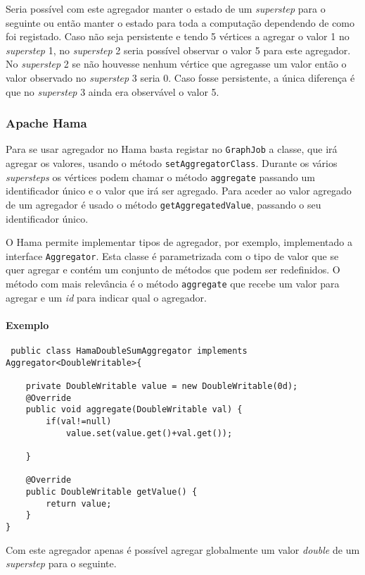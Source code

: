Seria possível com este agregador manter o estado de um \textit{superstep} para 
o seguinte ou então manter o estado para toda a computação dependendo de como 
foi registado. Caso não seja persistente e tendo 5 vértices a agregar o valor 1 
no \textit{superstep} 1, no \textit{superstep} 2 seria possível observar o 
valor 5 para este agregador. No \textit{superstep} 2 se não houvesse nenhum 
vértice que agregasse um valor então o valor observado no \textit{superstep} 3 
seria 0. Caso fosse persistente, a única diferença é que no \textit{superstep} 
3 ainda era observável o valor 5.

\subsubsection*{Apache Hama}
    Para se usar agregador no Hama basta registar no \texttt{GraphJob} a classe, que irá agregar os valores, usando o método
    \texttt{setAggregatorClass}. Durante os vários \textit{supersteps} os 
vértices podem chamar o método \texttt{aggregate} passando um identificador 
único
    e o valor que irá ser agregado. Para aceder ao valor agregado de um 
agregador é usado o método \texttt{getAggregatedValue}, passando o seu 
    identificador único.
    
    O Hama permite implementar tipos de agregador, por exemplo, implementado 
a interface \texttt{Aggregator}.
    Esta classe é parametrizada com o tipo de valor que se quer agregar e 
contém um conjunto de métodos que podem ser redefinidos.
O método com mais relevância é o método \texttt{aggregate} que recebe um 
valor para agregar e um \textit{id} para indicar qual o agregador.

\paragraph{Exemplo}
\begin{verbatim}
 public class HamaDoubleSumAggregator implements Aggregator<DoubleWritable>{

	private DoubleWritable value = new DoubleWritable(0d);
	@Override
	public void aggregate(DoubleWritable val) {
		if(val!=null)
			value.set(value.get()+val.get());
		
	}

	@Override
	public DoubleWritable getValue() {
		return value;
	}
}
\end{verbatim}

  Com este agregador apenas é possível agregar globalmente um valor 
\textit{double} de um \textit{superstep} para o seguinte.

